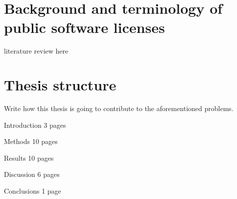 \section{Background and terminology of public software licenses}
literature review here

\section{Thesis structure}

Write how this thesis is going to contribute to the aforementioned problems.

Introduction 3 pages

Methods 10 pages

Results 10 pages

Discussion 6 pages

Conclusions 1 page
